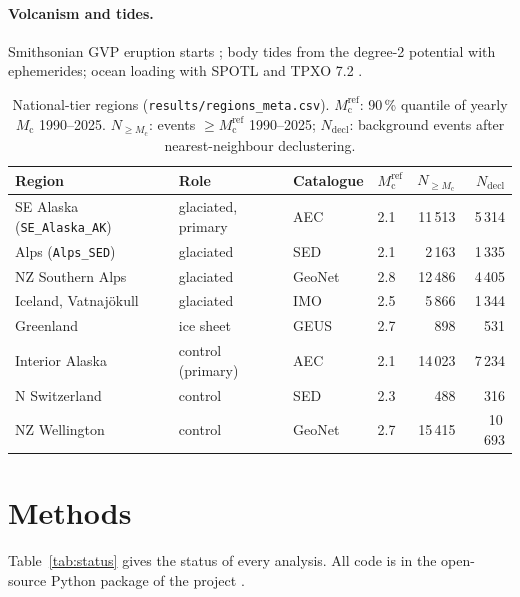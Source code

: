 \documentclass[11pt,a4paper]{article}
\newcommand{\Mc}{M_\mathrm{c}}
\begin{document}
\paragraph{Volcanism and tides.}
Smithsonian GVP eruption starts \parencite{gvp}; body tides from the degree-2 potential with \textcite{meeus1998} ephemerides; ocean loading with SPOTL \parencite{agnew1997,spotl} and TPXO 7.2 \parencite{egbert2002}.

\begin{table}[t]
\centering\small
\caption{National-tier regions (\texttt{results/regions\_meta.csv}). $\Mc^\mathrm{ref}$: 90\,\% quantile of yearly $\Mc$ 1990--2025. $N_{\geq \Mc}$: events $\geq\Mc^\mathrm{ref}$ 1990--2025; $N_\mathrm{decl}$: background events after nearest-neighbour declustering.}
\label{tab:regions}
\begin{tabular}{llllrr}
\toprule
Region & Role & Catalogue & $\Mc^\mathrm{ref}$ & $N_{\geq \Mc}$ & $N_\mathrm{decl}$\\
\midrule
SE Alaska (\texttt{SE\_Alaska\_AK}) & glaciated, primary & AEC & 2.1 & 11\,513 & 5\,314\\
Alps (\texttt{Alps\_SED}) & glaciated & SED & 2.1 & 2\,163 & 1\,335\\
NZ Southern Alps & glaciated & GeoNet & 2.8 & 12\,486 & 4\,405\\
Iceland, Vatnaj\"okull & glaciated & IMO & 2.5 & 5\,866 & 1\,344\\
Greenland & ice sheet & GEUS & 2.7 & 898 & 531\\
Interior Alaska & control (primary) & AEC & 2.1 & 14\,023 & 7\,234\\
N Switzerland & control & SED & 2.3 & 488 & 316\\
NZ Wellington & control & GeoNet & 2.7 & 15\,415 & 10\,693\\
\bottomrule
\end{tabular}
\end{table}

\section{Methods}
\label{sec:methods}

Table~\ref{tab:status} gives the status of every analysis. All code is in the open-source Python package of the project \parencite{p133repo,p133pypi}.
\end{document}
